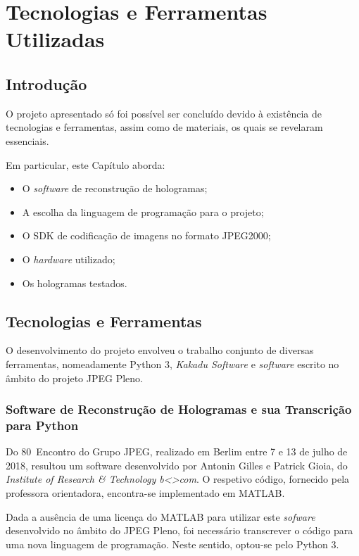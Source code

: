 \chapter{Tecnologias e Ferramentas Utilizadas}
\label{ch::tecno-ferr}

\section{Introdução}
\label{sec::tecno-ferr:intro}

O projeto apresentado só foi possível ser concluído devido à existência de tecnologias e ferramentas, assim como de materiais, os quais se revelaram essenciais.

Em particular, este Capítulo aborda:

\begin{itemize}
    \item O \textit{software} de reconstrução de hologramas;
    \item A escolha da linguagem de programação para o projeto;
    \item O \ac{SDK} de codificação de imagens no formato JPEG2000;
    \item O \textit{hardware} utilizado;
    \item Os hologramas testados.
\end{itemize}


\section{Tecnologias e Ferramentas}
\label{sec::tecno-ferr:tecno-ferr}

O desenvolvimento do projeto envolveu o trabalho conjunto de diversas ferramentas, nomeadamente Python 3, \textit{Kakadu Software} e \textit{software} escrito no âmbito do projeto JPEG Pleno.

\subsection{Software de Reconstrução de Hologramas e sua Transcrição para Python}

Do 80\textordmasculine~Encontro do Grupo JPEG, realizado em Berlim entre 7 e 13 de julho de 2018, resultou um software desenvolvido por Antonin Gilles e Patrick Gioia, do \textit{Institute of Research \& Technology b<>com}\cite{Gilles2018}. O respetivo código, fornecido pela professora orientadora, encontra-se implementado em MATLAB.

Dada a ausência de uma licença do MATLAB para utilizar este \textit{sofware} desenvolvido no âmbito do JPEG Pleno, foi necessário transcrever o código para uma nova linguagem de programação. Neste sentido, optou-se pelo Python 3.

